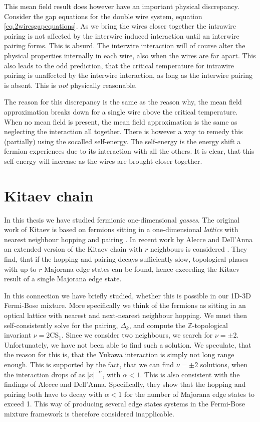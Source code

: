 This mean field result does however have an important physical discrepancy. Consider the gap equations for the double wire system, equation \eqref{eq.2wiresgapequations}. As we bring the wires closer together the intrawire pairing is not affected by the interwire induced interaction until an interwire pairing forms. This is absurd. The interwire interaction will of course alter the physical properties internally in each wire, also when the wires are far apart. This also leads to the odd prediction, that the critical temperature for intrawire pairing is unaffected by the interwire interaction, as long as the interwire pairing is absent. This is \textit{not} physically reasonable. 

The reason for this discrepancy is the same as the reason why, the mean field approximation breaks down for a single wire above the critical temperature. When no mean field is present, the mean field approximation is the same as neglecting the interaction all together. There is however a way to remedy this (partially) using the socalled self-energy. The self-energy is the energy shift a fermion experiences due to its interaction with all the others. It is clear, that this self-energy will increase as the wires are brought closer together. 

\section{Kitaev chain} \label{sec.Discussion.KitaevChain}
In this thesis we have studied fermionic one-dimensional \textit{gasses}. The original work of Kitaev is based on fermions sitting in a one-dimensional \textit{lattice} with nearest neighbour hopping and pairing \cite{KitaevQuantumWires}. In recent work by Alecce and Dell'Anna an extended version of the Kitaev chain with $r$ neighbours is considered \cite{Alecce.extendKitaev}. They find, that if the hopping and pairing decays sufficiently slow, topological phases with up to $r$ Majorana edge states can be found, hence exceeding the Kitaev result of a single Majorana edge state. 

In this connection we have briefly studied, whether this is possible in our 1D-3D Fermi-Bose mixture. More specifically we think of the fermions as sitting in an optical lattice with nearest and next-nearest neighbour hopping. We must then self-consistently solve for the pairing, $\Delta_k$, and compute the $\mathbb{Z}$-topological invariant $\nu = 2\text{CS}_1$. Since we consider two neighbours, we search for $\nu = \pm 2$. Unfortunately, we have not been able to find such a solution. We speculate, that the reason for this is, that the Yukawa interaction is simply not long range enough. This is supported by the fact, that we can find $\nu = \pm 2$ solutions, when the interaction drops of as $|x|^{-\alpha}$, with $\alpha < 1$. This is also consistent with the findings of Alecce and Dell'Anna. Specifically, they show that the hopping and pairing both have to decay with $\alpha < 1$ for the number of Majorana edge states to exceed 1. This way of producing several edge states systems in the Fermi-Bose mixture framework is therefore considered inapplicable. 


